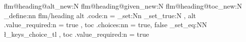 %
%
\ExplSyntaxOn
\ifcsname flm@heading@alt\endcsname\else\tl_new:N \flm@heading@alt\fi
\ifcsname flm@heading@given\endcsname\else\bool_new:N \flm@heading@given\fi
\ifcsname flm@heading@toc\endcsname\else\tl_new:N \flm@heading@toc\fi
\keys_define:nn {flm/heading}
  {alt .code:n = {\tl_set:Nn 
                  \bool_set_true:N \flm@heading@given} ,
   alt .value_required:n = true ,
   toc .choices:nn = {true, false} {\tl_set_eq:NN \flm@heading@toc \l_keys_choice_tl} ,
   toc .value_required:n = true}
